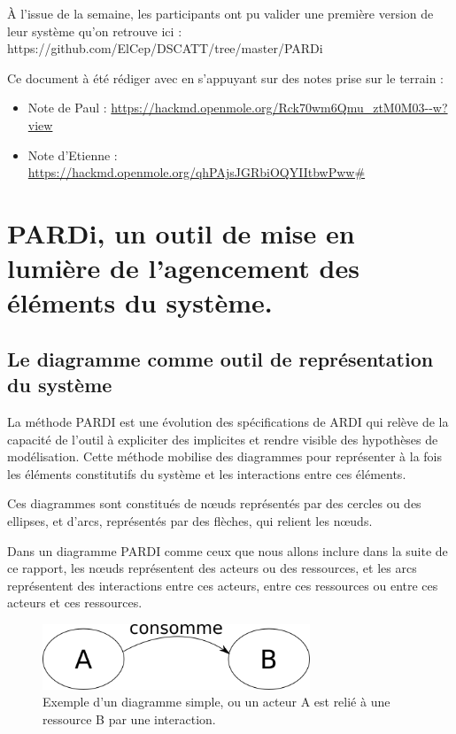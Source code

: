 À l'issue de la semaine, les participants ont pu valider une première version de leur système qu'on retrouve ici : https://github.com/ElCep/DSCATT/tree/master/PARDi

Ce document à été rédiger avec en s'appuyant sur des notes prise sur le terrain :
\begin{itemize}
  \item Note de Paul : \url{https://hackmd.openmole.org/Rck70wm6Qmu_ztM0M03--w?view}
  \item Note d'Etienne : \url{https://hackmd.openmole.org/qhPAjsJGRbiOQYIItbwPww#}
\end{itemize}


\section{PARDi, un outil de mise en lumière de l'agencement des éléments du système.}

\subsection{Le diagramme comme outil de représentation du système}

La méthode PARDI est une évolution des spécifications de ARDI\cite{etienne_ardi_2011} qui relève de la capacité de l'outil à expliciter des implicites et rendre visible des  hypothèses de modélisation. Cette méthode mobilise des diagrammes pour représenter à la fois les éléments constitutifs du système et les interactions entre ces éléments.

Ces diagrammes sont constitués de nœuds représentés par des cercles ou des ellipses, et d'arcs, représentés par des flèches, qui relient les nœuds.

Dans un diagramme PARDI comme ceux que nous allons inclure dans la suite de ce rapport, les nœuds représentent des acteurs ou des ressources, et les arcs représentent des interactions entre ces acteurs, entre ces ressources ou entre ces acteurs et ces ressources.

\begin{figure}[h!]
  \begin{center}
    \includegraphics[width=8cm]{img/diagramme_simple.png}
  \end{center}
  \caption{Exemple d'un diagramme simple, ou un acteur A est relié à une ressource B par une interaction.}
  \label{simple_interac}
\end{figure}


